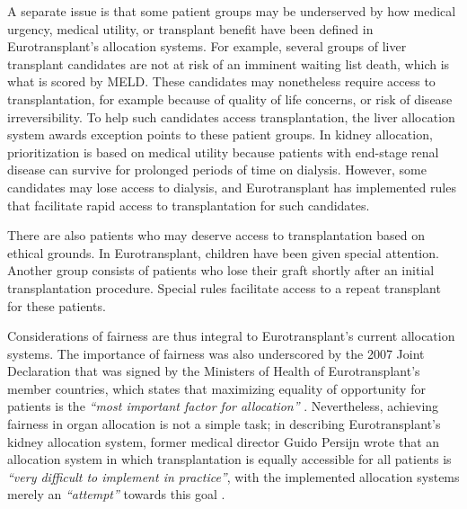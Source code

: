 \documentclass[11pt,twoside,]{book}
\begin{document}
A separate issue is that some patient groups may be underserved by how medical
urgency, medical utility, or transplant benefit have been defined in
Eurotransplant's allocation systems. For example, several groups of liver
transplant candidates are not at risk of an imminent waiting list death,
which is what is scored by MELD. These candidates may nonetheless require access to
transplantation, for example because of quality of life concerns,
or risk of disease irreversibility.
To help such candidates access transplantation, the liver allocation system awards exception
points to these patient groups. In kidney allocation, prioritization is based on
medical utility because patients with end-stage renal disease can survive for
prolonged periods of time on dialysis. However, some candidates may
lose access to dialysis, and Eurotransplant has implemented rules that facilitate
rapid access to transplantation for such candidates.

There are also patients who may deserve access to transplantation based on
ethical grounds. In Eurotransplant, children have been given special attention.
Another group consists of patients who lose their graft shortly after
an initial transplantation procedure. Special rules
facilitate access to a repeat transplant for these patients.

Considerations of fairness are thus integral to Eurotransplant's current
allocation systems. The importance of fairness was also underscored by the
2007 Joint Declaration that was signed by the Ministers of Health of
Eurotransplant's member countries, which states that maximizing equality of
opportunity for patients is the \emph{``most important factor for allocation''} \citep{ETMan2025}.
Nevertheless, achieving fairness in organ allocation is not a simple task; in describing
Eurotransplant's kidney allocation system, former medical director Guido Persijn
wrote that an allocation system in which transplantation is equally accessible
for all patients is \emph{``very difficult to implement in practice''}, with the
implemented allocation systems merely an \emph{``attempt''} towards this goal \citep{Persijn2006}.
\end{document}

